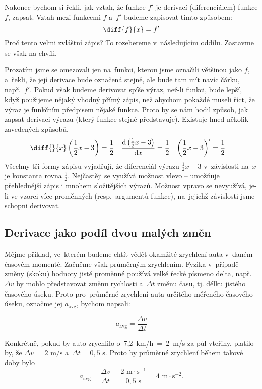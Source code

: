 Nakonec bychom si řekli, jak vztah, že funkce $f'$ je derivací (diferenciálem) funkce
$f$, zapsat. Vztah mezi funkcemi $f$ a~$f'$ budeme zapisovat tímto způsobem:
\begin{equation*}
    \diff{f}{x} = f'
\end{equation*}
Proč tento velmi zvláštní zápis? To rozebereme v~následujícím oddílu. Zastavme se
však na chvíli.

Prozatím jsme se omezovali jen na~funkci, kterou jsme označili většinou jako $f$,
a~řekli, že její derivace bude označená stejně, ale bude tam mít navíc čárku,
např.~$f'$. Pokud však budeme derivovat spíše výraz, než-li funkci, bude lepší, když
použijeme nějaký vhodný přímý zápis, než abychom pokaždé museli říct, že výraz je
funkčním předpisem nějaké funkce. Proto by se nám hodil způsob, jak zapsat derivaci
výrazu (který funkce stejně představuje). Existuje hned několik zavedených způsobů.
\begin{align*}
    \diff{}{x} \left( \frac12 x - 3 \right)                 & = \frac12 &
    \frac{\text{d} \left( \frac12 x - 3 \right)}{\text{d}x} & = \frac12 &
    \left( \frac12 x - 3 \right)'                           & = \frac12
\end{align*}
Všechny tři formy zápisu vyjadřují, že diferenciál výrazu $\frac12 x - 3$
v~závislosti na~$x$ je konstanta rovna $\frac12$. Nejčastěji se využívá možnost vlevo
-- umožňuje přehlednější zápis i mnohem složitějších výrazů. Možnost vpravo se
nevyužívá, je-li ve vzorci více proměnných (resp.\ argumentů funkce), na~jejichž
závislosti jsme schopni derivovat.

\subsection{Derivace jako podíl dvou malých změn}

Mějme příklad, ve~kterém budeme chtít vědět okamžité zrychlení auta v~daném časovém
momentě. Začněme však průměrným zrychlením. Fyzika v~případě změny (skoku) hodnoty
jisté proměnné používá velké řecké písmeno delta, např. $\Delta v$ by mohlo
představovat změnu rychlosti a~$\Delta t$ změnu času, tj. délku jistého časového
úseku. Proto pro~průměrné zrychlení auta určitého měřeného časového úseku, označme
jej $a_{\text{avg}}$,  bychom napsali:

\begin{equation*}
    a_{\text{avg}} = \frac{\Delta v}{\Delta t}
\end{equation*}

Konkrétně, pokud by auto zrychlilo o~7,2~km/h~=~2~m/s za půl vteřiny, platilo by, že
$\Delta v~= {2 \text{ m}/\text{s}}$ a~$\Delta t = {0,5 \text{ s}}$. Proto by průměrné
zrychlení během takové doby bylo
\begin{equation*}
    a_{\text{avg}}
    = \frac{\Delta v}{\Delta t}
    = \frac{2 \text{ m} \cdot \text{s}^{-1}}{0,5 \text{ s}}
    = 4 \text{ m} \cdot \text{s}^{-2}\text{.}
\end{equation*}

